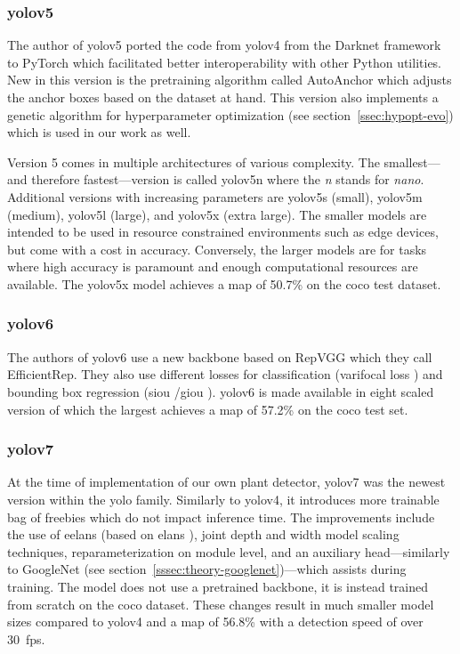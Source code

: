 \documentclass[draft,final]{vutinfth} %
\begin{document}
\subsubsection{\gls{yolo}v5}
\label{sssec:yolov5}

The author of \gls{yolo}v5 \cite{jocher2020} ported the code from
\gls{yolo}v4 from the Darknet framework to PyTorch which facilitated
better interoperability with other Python utilities. New in this
version is the pretraining algorithm called AutoAnchor which adjusts
the anchor boxes based on the dataset at hand. This version also
implements a genetic algorithm for hyperparameter optimization (see
section~\ref{ssec:hypopt-evo}) which is used in our work as well.

Version 5 comes in multiple architectures of various complexity. The
smallest---and therefore fastest---version is called \gls{yolo}v5n where
the \emph{n} stands for \emph{nano}. Additional versions with
increasing parameters are \gls{yolo}v5s (small), \gls{yolo}v5m
(medium), \gls{yolo}v5l (large), and \gls{yolo}v5x (extra large). The
smaller models are intended to be used in resource constrained
environments such as edge devices, but come with a cost in
accuracy. Conversely, the larger models are for tasks where high
accuracy is paramount and enough computational resources are
available. The \gls{yolo}v5x model achieves a \gls{map} of 50.7\% on
the \gls{coco} test dataset.

\subsubsection{\gls{yolo}v6}
\label{sssec:yolov6}

The authors of \gls{yolo}v6 \cite{li2022a} use a new backbone based on
RepVGG \cite{ding2021} which they call EfficientRep. They also use
different losses for classification (varifocal loss \cite{zhang2021})
and bounding box regression (\gls{siou}
\cite{gevorgyan2022}/\gls{giou} \cite{rezatofighi2019}). \gls{yolo}v6
is made available in eight scaled version of which the largest
achieves a \gls{map} of 57.2\% on the \gls{coco} test set.

\subsubsection{\gls{yolo}v7}
\label{sssec:yolov7}

At the time of implementation of our own plant detector, \gls{yolo}v7
\cite{wang2022} was the newest version within the \gls{yolo}
family. Similarly to \gls{yolo}v4, it introduces more trainable bag of
freebies which do not impact inference time. The improvements include
the use of \glspl{eelan} (based on \glspl{elan} \cite{wang2022a}),
joint depth and width model scaling techniques, reparameterization on
module level, and an auxiliary head---similarly to GoogleNet (see
section~\ref{sssec:theory-googlenet})---which assists during
training. The model does not use a pretrained backbone, it is instead
trained from scratch on the \gls{coco} dataset. These changes result
in much smaller model sizes compared to \gls{yolo}v4 and a \gls{map}
of 56.8\% with a detection speed of over \qty{30}{fps}.
\end{document}
